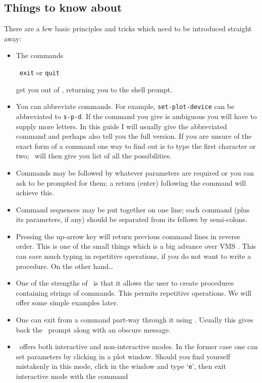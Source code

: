 \SP

\subsection{Things to know about \SPECX }
There are a few basic principles and tricks which need to be
introduced straight away:
\begin{itemize}
\item
The commands

\SP\ {\tt exit} or {\tt quit}

get you out of \SPECX , returning you to the shell prompt.
\item
You can abbreviate commands.  For example, {\tt set-plot-device} can
be abbreviated to {\tt s-p-d}. If the command you give is ambiguous
you will have to supply more letters. In this guide I will usually
give the abbreviated command and perhaps also tell you the full
version. If you are unsure of the exact form of a command one way to
find out is to type the first character or two; \SPECX\ will then give
you list of all the possibilities.
\item
Commands may be followed by whatever parameters are required or you
can ask to be prompted for them; a return (enter) following the
command will achieve this.
\item
Command sequences may be put together on one line; each command (plus
its parameters, if any) should be separated from its fellows by
semi-colons.
\item
Pressing the up-arrow key will return previous command lines in
reverse order. This is one of the small things which is a big advance
over VMS . This can save much typing in repetitive
operations, if you do not want to write a procedure. On the other
hand\ldots
\item
One of the strengths of \SPECX\ is that it allows the user to create
procedures containing strings of commands. This permits repetitive
operations. We will offer some simple examples later.
\item 
One can exit from a command part-way through it using \ctrlc .
Usually this gives back the \SPECX\ prompt along with an obscure
message.
\item
\SPECX\ offers both interactive and non-interactive modes. In the
former case one can set parameters by clicking in a plot
window. Should you find yourself mistakenly in this mode, click in the
window and type `{\tt{e}}', then exit interactive mode with the command


\end{itemize}
